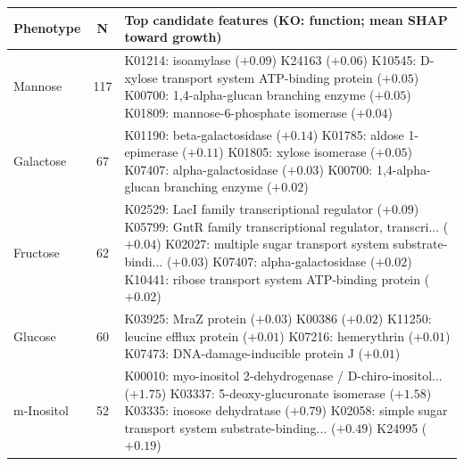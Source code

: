 \begin{table}[ht]
\centering
\small
\begin{tabular}{|l|c|p{10.5cm}|}
\hline
\textbf{Phenotype} & \textbf{N} & \textbf{Top candidate features (KO: function; mean SHAP toward growth)} \\
\hline
Mannose & 117 & K01214: isoamylase ($+0.09$) \newline K24163 ($+0.06$) \newline K10545: D-xylose transport system ATP-binding protein ($+0.05$) \newline K00700: 1,4-alpha-glucan branching enzyme ($+0.05$) \newline K01809: mannose-6-phosphate isomerase ($+0.04$) \\
\hline
Galactose & 67 & K01190: beta-galactosidase ($+0.14$) \newline K01785: aldose 1-epimerase ($+0.11$) \newline K01805: xylose isomerase ($+0.05$) \newline K07407: alpha-galactosidase ($+0.03$) \newline K00700: 1,4-alpha-glucan branching enzyme ($+0.02$) \\
\hline
Fructose & 62 & K02529: LacI family transcriptional regulator ($+0.09$) \newline K05799: GntR family transcriptional regulator, transcri... ($+0.04$) \newline K02027: multiple sugar transport system substrate-bindi... ($+0.03$) \newline K07407: alpha-galactosidase ($+0.02$) \newline K10441: ribose transport system ATP-binding protein ($+0.02$) \\
\hline
Glucose & 60 & K03925: MraZ protein ($+0.03$) \newline K00386 ($+0.02$) \newline K11250: leucine efflux protein ($+0.01$) \newline K07216: hemerythrin ($+0.01$) \newline K07473: DNA-damage-inducible protein J ($+0.01$) \\
\hline
m-Inositol & 52 & K00010: myo-inositol 2-dehydrogenase / D-chiro-inositol... ($+1.75$) \newline K03337: 5-deoxy-glucuronate isomerase ($+1.58$) \newline K03335: inosose dehydratase ($+0.79$) \newline K02058: simple sugar transport system substrate-binding... ($+0.49$) \newline K24995 ($+0.19$) \\

\end{tabular}
\end{table}
